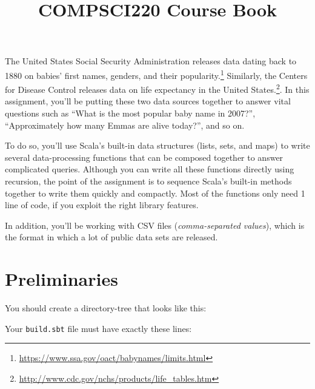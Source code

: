 \documentclass[9pt]{extbook}
\title{COMPSCI220 Course Book}
\begin{document}
\maketitle
\tableofcontents

















The United States Social Security Administration releases data dating back to
1880 on babies' first names, genders, and their
popularity.\footnote{\url{https://www.ssa.gov/oact/babynames/limits.html}}
Similarly, the Centers for Disease Control releases data on life expectancy
in the United States.\footnote{\url{http://www.cdc.gov/nchs/products/life_tables.htm}}.
In this assignment, you'll be putting these two data sources together
to answer vital questions such as ``What is the most popular baby name in 2007?'',
``Approximately how many Emmas are alive today?'', and so on.

To do so, you'll use Scala's built-in data
structures (lists, sets, and maps) to write several data-processing functions
that can be composed together to answer complicated queries.
Although you can write all these functions directly using recursion,
the point of the assignment is to sequence Scala's built-in methods together
to write them quickly and compactly. Most of the functions only need
1 line of code, if you exploit the right library features.

In addition, you'll be working with CSV files (\emph{comma-separated values}),
which is the format in which a lot of public data sets are released.

\section{Preliminaries}

You should create a directory-tree that looks like this:


Your \texttt{build.sbt} file must have exactly these lines:
\end{document}
